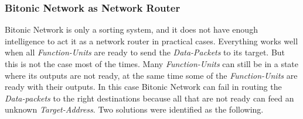 			\subsubsection{Bitonic Network as Network Router}
				  Bitonic Network is only a sorting system, and it does not have enough intelligence to act it as a network router in practical cases. Everything works well when all \textit{Function-Units} 
				  are ready to send the \textit{Data-Packets} to its target. But this is not the case most of the times. Many \textit{Function-Units} can still be in a state where its outputs are not ready,
				  at the same time some of the \textit{Function-Units} are ready with their outputs. In this case Bitonic Network can fail in routing the \textit{Data-packets} to the right destinations because all
				  that are not ready can feed an unknown \textit{Target-Address}. Two solutions were identified as the following.
